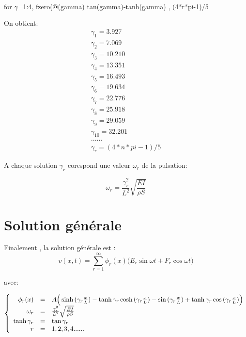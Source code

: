 \documentclass[a4paper,10pt]{report} %
\begin{document}
\begin{center}
for $\gamma$=1:4,
   fzero(@(gamma) tan(gamma)-tanh(gamma) , (4*r*pi-1)/5
\end{center}

On obtient:
\begin{align}
    \gamma_1=3.927\\
    \gamma_2=7.069\\
    \gamma_3=10.210\\
    \gamma_4=13.351\\
    \gamma_5=16.493\\
    \gamma_6= 19.634\\
    \gamma_7=22.776\\
    \gamma_8=25.918\\
    \gamma_9=29.059\\
    \gamma_{10}=32.201\\
    ......\\
    \gamma_r=(4*n*pi-1)/5
\end{align}

A chaque solution $\gamma_r$ corespond une valeur $\omega_r$ de la pulsation:

\begin{equation}
    \omega_r=\frac{\gamma_r^2}{L^2}\sqrt{\frac{EI}{\rho S}}
\end{equation}

\section{Solution générale}
Finalement , la solution générale est :
\begin{equation}
    v(x,t)=\sum\limits_{r=1}^{\infty}\phi_r(x)(E_r\sin{\omega t}+F_r\cos{\omega t)}
\end{equation}

avec:

\begin{equation}
    \left\{
    \begin{array}{r c l}
    \phi_r(x)&=&A\Big(\sinh{(\gamma_r\frac{x}{L})}-\tanh{\gamma_r}\cosh{(\gamma_r\frac{x}{L})}-\sin{(\gamma_r\frac{x}{L})}+\tanh{\gamma_r}\cos{(\gamma_r\frac{x}{L})}\Big)\\
    \omega_r&=&\frac{\gamma_r^2}{L^2}\sqrt{\frac{EI}{\rho S}}\\
    \tanh{\gamma_r}&=&\tan{\gamma_r}\\
    r&=&1,2,3,4......
    \end{array}
    \right.
\end{equation}
\end{document}
